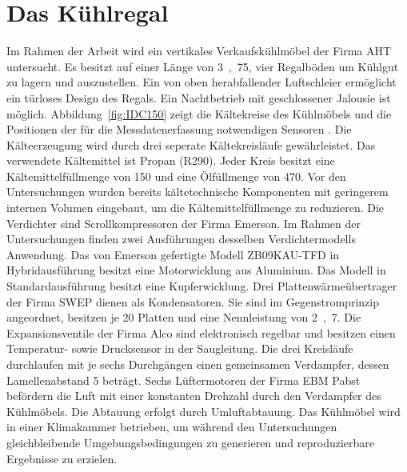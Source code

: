 \section{Das Kühlregal}
\label{sec:Das Kühlregal}

Im Rahmen der Arbeit wird ein vertikales Verkaufskühlmöbel der Firma AHT untersucht.
Es besitzt auf einer Länge von \unit{3,75}{\metre}, vier Regalböden um Kühlgut zu lagern und auszustellen. Ein von oben herabfallender Luftschleier ermöglicht ein türloses Design des Regals. Ein Nachtbetrieb mit geschlossener Jalousie ist möglich. \newline Abbildung~\ref{fig:IDC150} zeigt die Kältekreise des Kühlmöbels und die Positionen der für die Messdatenerfassung notwendigen Sensoren \cite{DINDeutschesInstitutfurNormunge.V..1998}. Die Kälteerzeugung wird durch drei seperate Kältekreisläufe gewährleistet. Das verwendete Kältemittel ist Propan (R290). Jeder Kreis besitzt eine Kältemittelfüllmenge von \unit{150}{\gram} und eine Ölfüllmenge von \unit{470}{\gram}. Vor den Untersuchungen wurden bereits kältetechnische Komponenten mit geringerem internen Volumen eingebaut, um die Kältemittelfüllmenge zu reduzieren. Die Verdichter sind Scrollkompressoren der Firma Emerson. Im Rahmen der Untersuchungen finden zwei Ausführungen desselben Verdichtermodells Anwendung. Das von Emerson gefertigte Modell ZB09KAU-TFD in Hybridausführung besitzt eine Motorwicklung aus Aluminium. Das Modell in Standardausführung besitzt eine Kupferwicklung. Drei Plattenwärmeübertrager der Firma SWEP dienen als Kondensatoren. Sie sind im Gegenstromprinzip angeordnet, besitzen je 20 Platten und eine Nennleistung von \unit{2,7}{\kilo\watt}. Die Expansionsventile der Firma Alco sind elektronisch regelbar und besitzen einen Temperatur- sowie Drucksensor in der Saugleitung. Die drei Kreisläufe durchlaufen mit je sechs Durchgängen einen gemeinsamen Verdampfer, dessen Lamellenabstand \unit{5}{\milli\metre} beträgt. Sechs Lüftermotoren der Firma EBM Pabst befördern die Luft mit einer konstanten Drehzahl durch den Verdampfer des Kühlmöbels. Die Abtauung erfolgt durch Umluftabtauung. Das Kühlmöbel wird in einer Klimakammer betrieben, um während den Untersuchungen gleichbleibende Umgebungsbedingungen zu generieren und reproduzierbare Ergebnisse zu erzielen.

